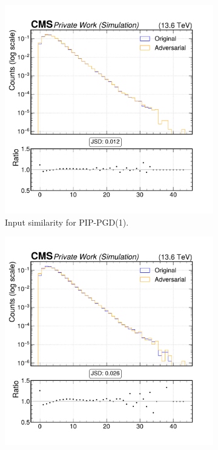 \begin{figure}[h]
  \centering
  \begin{subfigure}[t]{0.32\textwidth}
    \includegraphics[width=\linewidth]{media/output/features/compare/combined_it_1/cmp_global_features_n_Npfcand.pdf}
    \caption*{Input similarity for PIP-PGD(1).}
  \end{subfigure}\hfill
  \begin{subfigure}[t]{0.32\textwidth}
    \includegraphics[width=\linewidth]{media/output/features/compare/combined_it_2/cmp_global_features_n_Npfcand.pdf}

\end{subfigure}
\end{figure}
